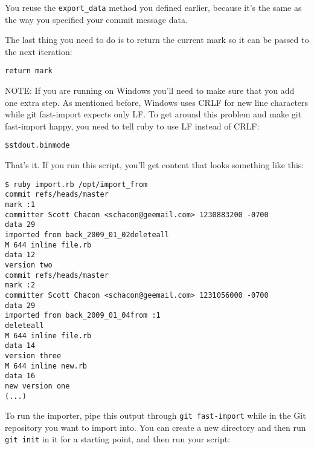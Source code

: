 \documentclass[a4paper]{book}
\begin{document}
You reuse the \texttt{export\_data} method you defined earlier, because it's the same as the way you specified your commit message data.

The last thing you need to do is to return the current mark so it can be passed to the next iteration:

\begin{shaded}\begin{verbatim}
return mark
\end{verbatim}\end{shaded}

NOTE: If you are running on Windows you'll need to make sure that you add one extra step. As mentioned before, Windows uses CRLF for new line characters while git fast-import expects only LF. To get around this problem and make git fast-import happy, you need to tell ruby to use LF instead of CRLF:

\begin{shaded}\begin{verbatim}
$stdout.binmode
\end{verbatim}\end{shaded}

That's it. If you run this script, you'll get content that looks something like this:

\begin{shaded}\begin{verbatim}
$ ruby import.rb /opt/import_from
commit refs/heads/master
mark :1
committer Scott Chacon <schacon@geemail.com> 1230883200 -0700
data 29
imported from back_2009_01_02deleteall
M 644 inline file.rb
data 12
version two
commit refs/heads/master
mark :2
committer Scott Chacon <schacon@geemail.com> 1231056000 -0700
data 29
imported from back_2009_01_04from :1
deleteall
M 644 inline file.rb
data 14
version three
M 644 inline new.rb
data 16
new version one
(...)
\end{verbatim}\end{shaded}

To run the importer, pipe this output through \texttt{git fast-import} while in the Git repository you want to import into. You can create a new directory and then run \texttt{git init} in it for a starting point, and then run your script:
\end{document}
